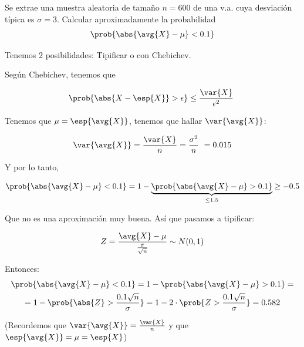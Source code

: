 \begin{problem}[6]
Se extrae una muestra aleatoria de tamaño $n = 600$ de una v.a. cuya desviación típica es $\sigma = 3$.
Calcular aproximadamente la probabilidad
\[\prob{\abs{\avg{X} - \mu} < 0.1}\]

\solution
Tenemos 2 posibilidades: Tipificar o con Chebichev.

Según Chebichev, tenemos que 

\[ \prob{\abs{X - \esp{X}} > \epsilon} \leq \frac{\var{X}}{\epsilon^2} \]

Tenemos que $\mu = \esp{\avg{X}}$, tenemos que hallar $\var{\avg{X}}$:

\[ \var{\avg{X}} = \frac{\var{X}}{n} = \frac{\sigma^2}{n} = 0.015 \]

Y por lo tanto,

\[
\prob{\abs{\avg{X} - \mu} < 0.1} =
1 - \underbrace{\prob{\abs{\avg{X} - \mu} > 0.1}}_{ \leq 1.5} \geq 
-0.5
\]

Que no es una aproximación muy buena. Así que pasamos a tipificar:

\[ Z = \frac{\avg{X} - \mu}{\frac{\sigma}{\sqrt{n}}} \sim N(0,1) \]

Entonces:
\begin{gather*}
\prob{\abs{\avg{X} - \mu} < 0.1} =
1 - \prob{\abs{\avg{X} - \mu} > 0.1} =\\
= 1 - \prob{\abs{Z} > \frac{0.1\sqrt{n}}{\sigma}} =
1 - 2 \cdot \prob{Z > \frac{0.1\sqrt{n}}{\sigma}} =
0.582
\end{gather*}

(Recordemos que $\var{\avg{X}} = \frac{\var{X}}{n}$ y que $\esp{\avg{X}} = \mu = \esp{X}$)

\end{problem}

